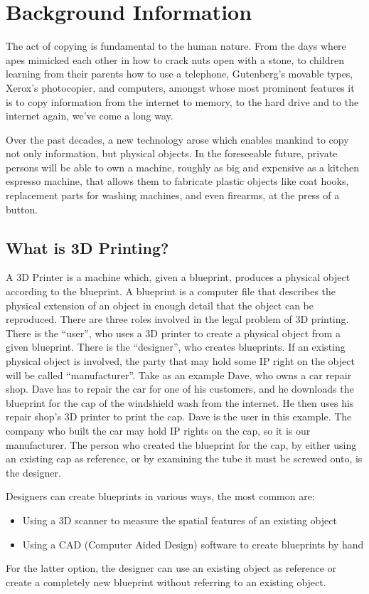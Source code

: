 \section{Background Information}

The act of copying is fundamental to the human nature.
From the days where apes mimicked each other in how to crack nuts open with a 
stone, to children learning from their parents how to use a telephone, 
Gutenberg’s movable types, Xerox’s photocopier, and computers, amongst whose 
most prominent features it is to copy information from the internet to memory, 
to the hard drive and to the internet again, we’ve come a long way.

Over the past decades, a new technology arose which enables mankind to copy not 
only information, but physical objects.
In the foreseeable future, private persons will be able to own a machine, 
roughly as big and expensive as a kitchen espresso machine, that allows them to 
fabricate plastic objects like coat hooks, replacement parts for washing 
machines, and even firearms, at the press of a button.

\subsection{What is 3D Printing?}
A 3D Printer is a machine which, given a blueprint, produces a physical object 
according to the blueprint.
A blueprint is a computer file that describes the physical extension of an 
object in enough detail that the object can be reproduced.
There are three roles involved in the legal problem of 3D printing.
There is the ``user'', who uses a 3D printer to create a physical object from a 
given blueprint. There is the ``designer'', who creates blueprints.
If an existing physical object is involved, the party that may hold some IP 
right on the object will be called ``manufacturer''.
Take as an example Dave, who owns a car repair shop.
Dave has to repair the car for one of his customers, and he downloads the 
blueprint for the cap of the windshield wash from the internet.
He then uses his repair shop’s 3D printer to print the cap.
Dave is the user in this example.
The company who built the car may hold IP rights on the cap, so it is our 
manufacturer.
The person who created the blueprint for the cap, by either using an existing 
cap as reference, or by examining the tube it must be screwed onto, is the 
designer.

Designers can create blueprints in various ways, the most common are:
\begin{itemize}
  \item Using a 3D scanner to measure the spatial features of an existing object
  \item Using a CAD (Computer Aided Design) software to create blueprints by hand
\end{itemize}
For the latter option, the designer can use an existing object as reference or 
create a completely new blueprint without referring to an existing object.

